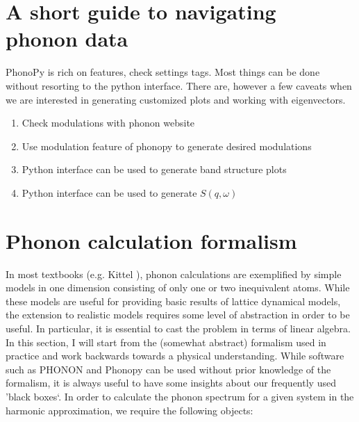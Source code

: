 \chapter{A short guide to navigating phonon data}

PhonoPy is rich on features, check settings tags. Most things can be done without resorting to the python interface. There are, however a few caveats when we are interested in generating customized plots and working with eigenvectors.

\begin{enumerate}
    \item Check modulations with phonon website
    \item Use modulation feature of phonopy to generate desired modulations
    \item Python interface can be used to generate band structure plots
    \item Python interface can be used to generate $S(q,\omega)$
\end{enumerate}

\chapter{Phonon calculation formalism}
\newcommand{\jp}{j^\prime}
\newcommand{\jpp}{j^{\prime\prime}}
\newcommand{\lp}{l^\prime}
\newcommand{\lpp}{l^{\prime\prime}}
\newcommand{\fc}{\bm{\Phi}\genfrac{(}{)}{0pt}{}{j \jp}{l \lp}}
\newcommand{\fczero}{\bm{\Phi}\genfrac{(}{)}{0pt}{}{j \jp}{0 \lp}}
\newcommand{\fcb}{\bm{\Theta}\genfrac{(}{)}{0pt}{}{j \jp}{l \lp}}
\newcommand{\fcbpp}{\bm{\Theta}\genfrac{(}{)}{0pt}{}{j \jpp}{l \lpp}}
\newcommand{\fcbf}{-\bm{\Theta}\genfrac{(}{)}{0pt}{}{j \jp}{l \lp} + \delta_{j,\jp} \delta_{l,\lp} \sum_{\jpp, \lpp}  \bm{\Theta}\genfrac{(}{)}{0pt}{}{j \jpp}{l \lpp} }
\newcommand*\tageq{\refstepcounter{equation}\tag{\theequation}}


In most textbooks (e.g. Kittel \cite{Kittel2005}), phonon calculations are exemplified by simple models in one dimension consisting of only one or two inequivalent atoms. While these models are useful for providing basic results of lattice dynamical models, the extension to realistic models requires some level of abstraction in order to be useful. In particular, it is essential to cast the problem in terms of linear algebra. In this section, I will start from the (somewhat abstract) formalism used in practice and work backwards towards a physical understanding. While software such as PHONON \cite{Parlinski1997} and Phonopy \cite{Togo2015} can be used without prior knowledge of the formalism, it is always useful to have some insights about our frequently used 'black boxes`. In order to calculate the phonon spectrum for a given system in the harmonic approximation, we require the following objects:

